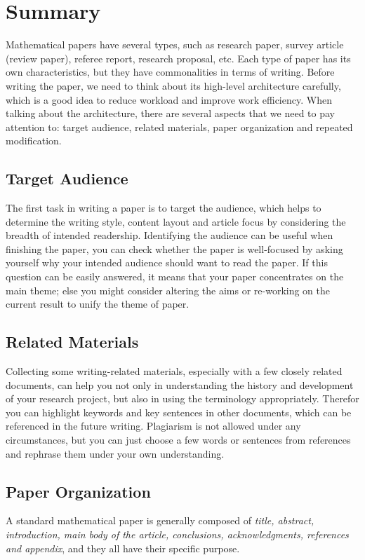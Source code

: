 \section{Summary}
Mathematical papers have several types, such as research paper, survey article (review paper), referee report, research proposal, etc. Each type of paper has its own characteristics, but they have commonalities in terms of writing. Before writing the paper, we need to think about its high-level architecture carefully, which is a good idea to reduce workload and improve work efficiency. When talking about the architecture, there are several aspects that we need to pay attention to: target audience, related materials, paper organization and repeated modification.


\subsection{Target Audience}
The first task in writing a paper is to target the audience, which helps to determine the writing style, content layout and article focus by considering the breadth of intended readership. Identifying the audience can be useful when finishing the paper, you can check whether the paper is well-focused by asking yourself why your intended audience should want to read the paper. If this question can be easily answered, it means that your paper concentrates on the main theme; else you might consider altering the aims or re-working on the current result to unify the theme of paper.


\subsection{Related Materials}
Collecting some writing-related materials, especially with a few closely related documents, can help you not only in understanding the history and development of your research project, but also in using the terminology appropriately. Therefor you can highlight keywords and key sentences in other documents, which can be referenced in the future writing. Plagiarism is not allowed under any circumstances, but you can just choose a few words or sentences from references and rephrase them under your own understanding.


\subsection{Paper Organization}
A standard mathematical paper is generally composed of \emph{title, abstract, introduction, main body of the article, conclusions, acknowledgments, references and appendix}, and they all have their specific purpose.

